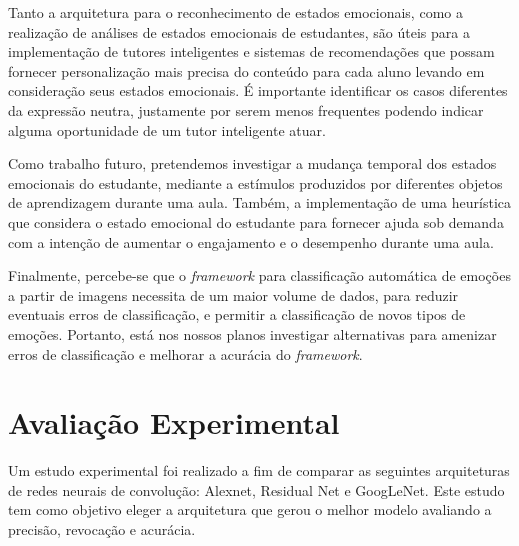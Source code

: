 Tanto a arquitetura para o reconhecimento de estados emocionais, como a
realização de análises de estados emocionais de estudantes, são úteis para a implementação de tutores inteligentes e sistemas de recomendações que possam fornecer personalização mais precisa do conteúdo para cada aluno levando em consideração seus estados emocionais. É importante identificar os casos diferentes da expressão neutra, justamente por serem menos frequentes podendo indicar alguma oportunidade de um tutor inteligente atuar.

Como trabalho futuro, pretendemos investigar a mudança temporal dos estados emocionais do estudante, mediante a estímulos produzidos por diferentes objetos de aprendizagem durante uma aula. Também, a implementação de uma heurística que considera o estado emocional do estudante para fornecer ajuda sob demanda com a intenção de aumentar o engajamento e o desempenho durante uma aula.

Finalmente, percebe-se que o \textit{framework} para classificação automática de emoções a partir de imagens necessita de um maior volume de dados, para reduzir eventuais erros de classificação, e permitir a classificação de novos tipos de emoções. Portanto, está nos nossos planos investigar alternativas para amenizar erros de classificação e melhorar a acurácia do \textit{framework}.

\section{Avaliação Experimental}\label{sec:avalexp}

Um estudo experimental foi realizado a fim de comparar as seguintes arquiteturas de redes neurais de convolução: Alexnet, Residual Net e GoogLeNet. Este estudo tem como objetivo eleger a arquitetura que gerou o melhor modelo avaliando a precisão, revocação e acurácia.  



